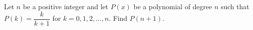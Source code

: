 Let $n$ be a positive integer and let $P(x)$ be a polynomial of degree $n$ such that $P(k)=\dfrac{k}{k+1}$ for $k=0,1,2,\dots,n$. Find $P(n+1)$.
